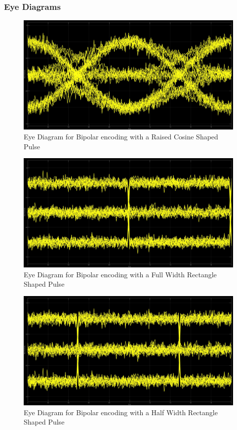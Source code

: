 \documentclass{article}
\begin{document}
\subsubsection{Eye Diagrams}
\begin{figure}[H]
  \includegraphics[width = \linewidth]{BP_Raised_Eye.jpg}
  \caption{Eye Diagram for Bipolar encoding with a Raised Cosine Shaped Pulse}
  \label{fig:BP-Raised-Eye}
\end{figure}
\begin{figure}[H]
  \includegraphics[width = \linewidth]{BP_Rect_F_Eye.jpg}
  \caption{Eye Diagram for Bipolar encoding with a Full Width Rectangle Shaped Pulse}
  \label{fig:BP-Rect-F-Eye}
\end{figure}
\begin{figure}[H]
  \includegraphics[width = \linewidth]{BP_Rect_H_Eye.jpg}
  \caption{Eye Diagram for Bipolar encoding with a Half Width Rectangle Shaped Pulse}
  \label{fig:BP-Rect-H-Eye}
\end{figure}
\end{document}
